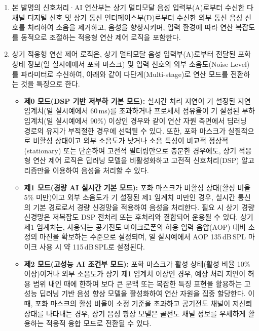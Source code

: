 \documentclass{article}
\DeclareRobustCommand{\codexedit}[1]{\textcolor{customorange}{#1}}
\DeclareRobustCommand{\vtwoedit}[1]{\textcolor{customgreen}{#1}}
\begin{document}
\begin{enumerate}[label = \textbf{(B.1.\arabic*)}]

    \item 본 발명의 신호처리·AI 연산부는 상기 멀티모달 음성 입력부(A)로부터 수신한 다채널 디지털 신호 및 상기 통신 인터페이스부(D)로부터 수신한 외부 통신 음성 신호를 처리하여 소음을 제거하고, 음성을 향상시키며, 입력 환경에 따라 연산 복잡도를 동적으로 조절하는 적응형 연산 제어 로직을 포함한다.

    \item \vtwoedit{상기 적응형 연산 제어 로직은, 상기 멀티모달 음성 입력부(A)로부터 전달된 포화 상태 정보(일 실시예에서 포화 마스크) 및 입력 신호의 외부 소음도(Noise Level)를 파라미터로 수신하여, 아래와 같이 다단계(Multi-stage)로 연산 모드를 전환하는 것을 특징으로 한다.}

    \begin{itemize}
        \item \codexedit{\textbf{제0 모드(DSP 기반 저부하 기본 모드):}} 실시간 처리 지연이 기 설정된 지연 임계치(일 실시예에서 60\,ms)를
        초과하거나 프로세서 점유율이 기 설정된 부하 임계치(일 실시예에서 90\%) 이상인 경우와 같이 연산 자원 측면에서
        딥러닝 경로의 유지가 부적절한 경우에 선택될 수 있다. 또한, 포화 마스크가 실질적으로 비활성 상태이고
        외부 소음도가 낮거나 소음 특성이 비교적 정상적(stationary) 또는 단순하여 고전적 필터링만으로 충분한 경우에도,
        상기 적응형 연산 제어 로직은 딥러닝 모델을 비활성화하고 고전적 신호처리(DSP) 알고리즘만을 이용하여 음성을
        처리할 수 있다.

        \item \textbf{제1 모드(경량 AI 실시간 기본 모드):} 포화 마스크가 비활성 상태(활성 비율 5\% 미만)이고
        외부 소음도가 기 설정된 제1 임계치 미만인 경우, 실시간 통신의 기본 경로로서 경량 신경망을 적용하여 음성을 처리한다. 필요 시 상기 경량 신경망은 저복잡도 DSP 전처리 또는 후처리와 결합되어 운용될 수 있다. 상기 제1 임계치는, 사용되는 공기전도 마이크로폰의 허용 입력 음압(AOP) 대비 소정의 마진을 확보하는 수준으로 설정되며, 일 실시예에서 AOP 135\,dB\,SPL 마이크 사용 시 약 115\,dB\,SPL로 설정된다.

        \item \textbf{제2 모드(고성능 AI 조건부 모드):} 포화 마스크가 활성 상태(활성 비율 10\% 이상)이거나 외부 소음도가 상기 제1 임계치 이상인 경우, 예상 처리 지연이 허용 범위 내인 때에 한하여 보다 큰 문맥 또는 복잡한 특징 표현을 활용하는 고성능 딥러닝 기반 음성 향상 모델을 활성화하여 연산 자원을 집중 할당한다. 이때, 포화 마스크의 활성 비율이 소정 기준을 초과하고 공기전도 채널이 저신뢰 상태를 나타내는 경우, 상기 음성 향상 모델은 골전도 채널 정보를 우세하게 활용하는 적응적 융합 모드로 전환될 수 있다.
    \end{itemize}


\end{enumerate}
\end{document}
